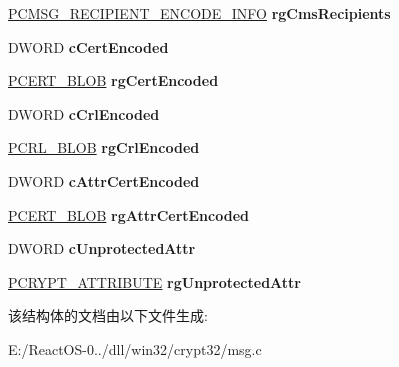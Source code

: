 \begin{DoxyCompactItemize}
\hyperlink{struct___c_m_s_g___r_e_c_i_p_i_e_n_t___e_n_c_o_d_e___i_n_f_o}{P\+C\+M\+S\+G\+\_\+\+R\+E\+C\+I\+P\+I\+E\+N\+T\+\_\+\+E\+N\+C\+O\+D\+E\+\_\+\+I\+N\+FO} {\bfseries rg\+Cms\+Recipients}
\item 
\mbox{\label{struct___c_m_s_g___e_n_v_e_l_o_p_e_d___e_n_c_o_d_e___i_n_f_o___w_i_t_h___c_m_s_a355e731caed7813152ec0f09a468348a}} 
D\+W\+O\+RD {\bfseries c\+Cert\+Encoded}
\item 
\mbox{\label{struct___c_m_s_g___e_n_v_e_l_o_p_e_d___e_n_c_o_d_e___i_n_f_o___w_i_t_h___c_m_s_aeb3bfea3310ffdac48c25e00eb32fde5}} 
\hyperlink{struct___c_r_y_p_t_o_a_p_i___b_l_o_b}{P\+C\+E\+R\+T\+\_\+\+B\+L\+OB} {\bfseries rg\+Cert\+Encoded}
\item 
\mbox{\label{struct___c_m_s_g___e_n_v_e_l_o_p_e_d___e_n_c_o_d_e___i_n_f_o___w_i_t_h___c_m_s_a57ad9a5d5626aba224f69f3acf25c232}} 
D\+W\+O\+RD {\bfseries c\+Crl\+Encoded}
\item 
\mbox{\label{struct___c_m_s_g___e_n_v_e_l_o_p_e_d___e_n_c_o_d_e___i_n_f_o___w_i_t_h___c_m_s_a92f80c0c41292571200576357c75f1c5}} 
\hyperlink{struct___c_r_y_p_t_o_a_p_i___b_l_o_b}{P\+C\+R\+L\+\_\+\+B\+L\+OB} {\bfseries rg\+Crl\+Encoded}
\item 
\mbox{\label{struct___c_m_s_g___e_n_v_e_l_o_p_e_d___e_n_c_o_d_e___i_n_f_o___w_i_t_h___c_m_s_a19ba9f013d84bd4b9e59b199f0f7fa63}} 
D\+W\+O\+RD {\bfseries c\+Attr\+Cert\+Encoded}
\item 
\mbox{\label{struct___c_m_s_g___e_n_v_e_l_o_p_e_d___e_n_c_o_d_e___i_n_f_o___w_i_t_h___c_m_s_a3e8db2b6987e384e944c2aed11075ed9}} 
\hyperlink{struct___c_r_y_p_t_o_a_p_i___b_l_o_b}{P\+C\+E\+R\+T\+\_\+\+B\+L\+OB} {\bfseries rg\+Attr\+Cert\+Encoded}
\item 
\mbox{\label{struct___c_m_s_g___e_n_v_e_l_o_p_e_d___e_n_c_o_d_e___i_n_f_o___w_i_t_h___c_m_s_af6a5a76ab01ada50eb279895bda4cbdb}} 
D\+W\+O\+RD {\bfseries c\+Unprotected\+Attr}
\item 
\mbox{\label{struct___c_m_s_g___e_n_v_e_l_o_p_e_d___e_n_c_o_d_e___i_n_f_o___w_i_t_h___c_m_s_ac9ff25ad04258922333df5554e7a19c9}} 
\hyperlink{struct___c_r_y_p_t___a_t_t_r_i_b_u_t_e}{P\+C\+R\+Y\+P\+T\+\_\+\+A\+T\+T\+R\+I\+B\+U\+TE} {\bfseries rg\+Unprotected\+Attr}
\end{DoxyCompactItemize}


该结构体的文档由以下文件生成\+:\begin{DoxyCompactItemize}
\item 
E\+:/\+React\+O\+S-\/0../dll/win32/crypt32/msg.\+c\end{DoxyCompactItemize}
